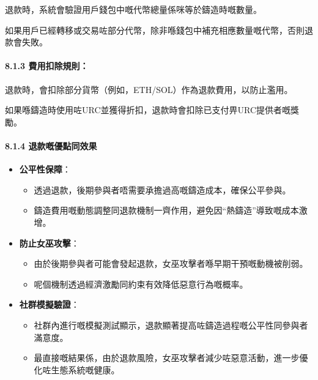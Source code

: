 \documentclass[
]{article}
\providecommand{\tightlist}{%
  \setlength{\itemsep}{0pt}\setlength{\parskip}{0pt}}
\begin{document}
退款時，系統會驗證用戶錢包中嘅代幣總量係咪等於鑄造時嘅數量。

如果用戶已經轉移或交易咗部分代幣，除非喺錢包中補充相應數量嘅代幣，否則退款會失敗。

\paragraph{8.1.3
費用扣除規則：}\label{ux8cbbux7528ux6263ux9664ux898fux5247}

退款時，會扣除部分貨幣（例如，ETH/SOL）作為退款費用，以防止濫用。

如果喺鑄造時使用咗URC並獲得折扣，退款時會扣除已支付畀URC提供者嘅獎勵。

\paragraph{8.1.4
退款嘅優點同效果}\label{ux9000ux6b3eux5605ux512aux9edeux540cux6548ux679c}

\begin{itemize}
\tightlist
\item
  \textbf{公平性保障}：

  \begin{itemize}
  \tightlist
  \item
    透過退款，後期參與者唔需要承擔過高嘅鑄造成本，確保公平參與。
  \item
    鑄造費用嘅動態調整同退款機制一齊作用，避免因``熱鑄造''導致嘅成本激增。
  \end{itemize}
\item
  \textbf{防止女巫攻擊}：

  \begin{itemize}
  \tightlist
  \item
    由於後期參與者可能會發起退款，女巫攻擊者喺早期干預嘅動機被削弱。
  \item
    呢個機制透過經濟激勵同約束有效降低惡意行為嘅概率。
  \end{itemize}
\item
  \textbf{社群模擬驗證}：

  \begin{itemize}
  \tightlist
  \item
    社群內進行嘅模擬測試顯示，退款顯著提高咗鑄造過程嘅公平性同參與者滿意度。
  \item
    最直接嘅結果係，由於退款風險，女巫攻擊者減少咗惡意活動，進一步優化咗生態系統嘅健康。
  \end{itemize}
\end{itemize}
\end{document}
